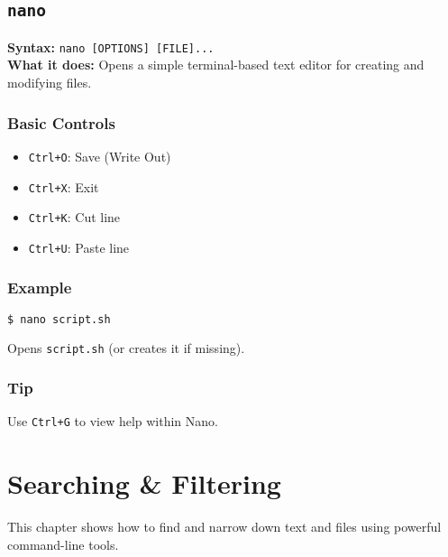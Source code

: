\documentclass[10pt,oneside]{scrbook}
\begin{document}
\section{\texttt{nano}}
\begin{cmdbox}
  \textbf{Syntax:} \lstinline!nano [OPTIONS] [FILE]...! \\
  \textbf{What it does:} Opens a simple terminal-based text editor for creating and modifying files.
\end{cmdbox}
\begin{commanddetails}
  \subsection*{Basic Controls}
  \begin{itemize}
    \item \texttt{Ctrl+O}: Save (Write Out)
    \item \texttt{Ctrl+X}: Exit
    \item \texttt{Ctrl+K}: Cut line
    \item \texttt{Ctrl+U}: Paste line
  \end{itemize}

  \subsection*{Example}
  \begin{lstlisting}[language=bash]
$ nano script.sh
  \end{lstlisting}
  Opens \texttt{script.sh} (or creates it if missing).

  \subsection*{Tip}
  Use \texttt{Ctrl+G} to view help within Nano.
\end{commanddetails}

\chapter{Searching \& Filtering}

This chapter shows how to find and narrow down text and files using powerful command-line tools.

\end{document}
